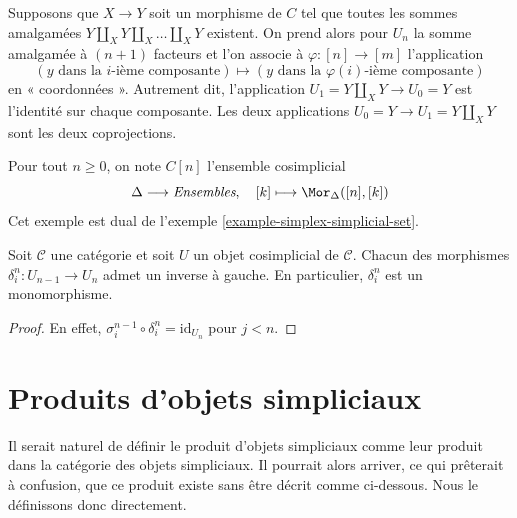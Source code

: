 \begin{example}
\label{example-push-outs-simplicial-object}
Supposons que $X\to Y$ soit un morphisme de $C$ tel que toutes les
sommes amalgamées $Y\amalg_X Y \amalg_X \ldots \amalg_X Y$ existent.
On prend alors pour $U_n$ la somme amalgamée à $(n + 1)$ facteurs et
l'on associe à $\varphi : [n] \to [m]$ l'application
$$
(y \text{ dans la }i\text{-ième composante})
\mapsto
(y \text{ dans la }\varphi(i)\text{-ième composante})
$$
en « coordonnées ». Autrement dit, l'application
$U_1 = Y \amalg_X Y \to U_0 = Y$ est l'identité sur chaque composante.
Les deux applications $U_0 = Y \to U_1 = Y \amalg_X Y$ sont les deux
coprojections.
\end{example}

\begin{example}
\label{example-simplex-cosimplicial-set}
Pour tout $n \geq 0$, on note $C[n]$ l'ensemble cosimplicial
$$
\Delta \longrightarrow \textit{Ensembles},\quad
[k] \longmapsto \Mor_{\Delta}([n], [k])
$$
Cet exemple est dual de l'exemple \ref{example-simplex-simplicial-set}.
\end{example}

\begin{lemma}
\label{lemma-di-injective}
Soit $\mathcal{C}$ une catégorie et soit $U$ un objet cosimplicial de
$\mathcal{C}$. Chacun des morphismes $\delta^n_i : U_{n - 1} \to U_n$
admet un inverse à gauche. En particulier, $\delta^n_i$ est un
monomorphisme.
\end{lemma}

\begin{proof}
En effet,
$\sigma_i^{n - 1} \circ \delta^n_i = \text{id}_{U_n}$
pour $j < n$.
\end{proof}


























\section{Produits d'objets simpliciaux}
\label{section-products}

\noindent
Il serait naturel de définir le produit d'objets simpliciaux comme leur
produit dans la catégorie des objets simpliciaux. Il pourrait alors arriver,
ce qui prêterait à confusion, que ce produit existe sans être décrit comme
ci-dessous. Nous le définissons donc directement.

